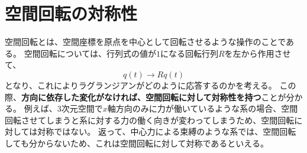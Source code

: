\documentclass[a4paper]{jsreport}
\begin{document}
        \section{空間回転の対称性}
            空間回転とは、空間座標を原点を中心として回転させるような操作のことである。
            空間回転については、行列式の値が$1$になる回転行列$R$を左から作用させて、
            \begin{equation}
                q(t) \to Rq(t)
            \end{equation}
            となり、これによりラグランジアンがどのように応答するのかを考える。
            この際、\textbf{方向に依存した変化がなければ、空間回転に対して対称性を持つ}ことが分かる。
            例えば、$3$次元空間で$x$軸方向のみに力が働いているような系の場合、空間回転させてしまうと系に対する力の働く向きが変わってしまうため、空間回転に対しては対称ではない。
            返って、中心力による束縛のような系では、空間回転しても分からないため、これは空間回転に対して対称であるといえる。
\end{document}
